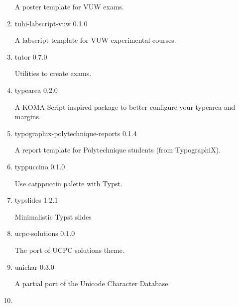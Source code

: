 \begin{enumerate}
  A poster template for VUW exams.
\item
  \href{/universe/package/tuhi-labscript-vuw/}{}


  { tuhi-labscript-vuw } { 0.1.0 }

  A labscript template for VUW experimental courses.
\item
  \href{/universe/package/tutor/}{}

  { tutor } { 0.7.0 }

  Utilities to create exams.
\item
  \href{/universe/package/typearea/}{}

  { typearea } { 0.2.0 }

  A KOMA-Script inspired package to better configure your typearea and
  margins.
\item
  \href{/universe/package/typographix-polytechnique-reports/}{}


  { typographix-polytechnique-reports } { 0.1.4 }

  A report template for Polytechnique students (from TypographiX).
\item
  \href{/universe/package/typpuccino/}{}

  { typpuccino } { 0.1.0 }

  Use catppuccin palette with Typst.
\item
  \href{/universe/package/typslides/}{}

  { typslides } { 1.2.1 }

  Minimalistic Typst slides
\item
  \href{/universe/package/ucpc-solutions/}{}


  { ucpc-solutions } { 0.1.0 }

  The port of UCPC solutions theme.
\item
  \href{/universe/package/unichar/}{}

  { unichar } { 0.3.0 }

  A partial port of the Unicode Character Database.
\item
  \href{/universe/package/unilab/}{}


\end{enumerate}
